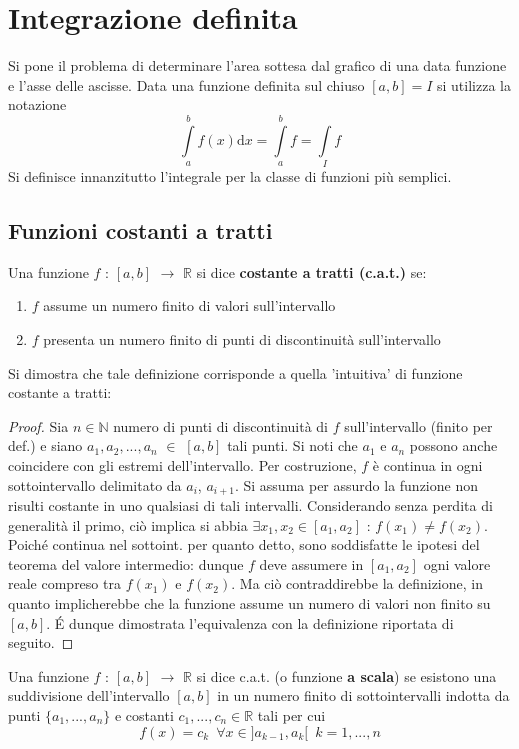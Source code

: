 \documentclass[10pt]{article}
\theoremstyle{plain}
\begin{document}
\section{Integrazione definita}
Si pone il problema di determinare l'area sottesa dal grafico di una data funzione e l'asse delle ascisse. Data una funzione definita sul chiuso $[a,b] = I$ si utilizza la notazione
\[\int \limits_a^b f(x) \textrm{d}x = \int \limits_a^b f = \int \limits_I f\]
Si definisce innanzitutto l'integrale per la classe di funzioni più semplici.

\subsection{Funzioni costanti a tratti}
\begin{defin}
    Una funzione $f$ : $[a,b]$ $\rightarrow$ $\mathbb{R}$ si dice \textbf{costante a tratti (c.a.t.)} se:
    \begin{enumerate}
        \item $f$ assume un numero finito di valori sull'intervallo
        \item $f$ presenta un numero finito di punti di discontinuità sull'intervallo
    \end{enumerate}
\end{defin}
Si dimostra che tale definizione corrisponde a quella 'intuitiva' di funzione costante a tratti:
\begin{proof}
    Sia $n \in \mathbb{N}$ numero di punti di discontinuità di $f$ sull'intervallo (finito per def.) e siano $a_1, a_2, ..., a_n$ $\in$ $[a,b]$ tali punti. Si noti che $a_1$ e $a_n$ possono anche coincidere con gli estremi dell'intervallo. Per costruzione, $f$ è continua in ogni sottointervallo delimitato da $a_i$, $a_{i+1}$. Si assuma per assurdo la funzione non risulti costante in uno qualsiasi di tali intervalli. Considerando senza perdita di generalità il primo, ciò implica si abbia $\exists x_1, x_2 \in [a_1, a_2]$ : $f(x_1) \neq f(x_2)$. Poiché continua nel sottoint. per quanto detto, sono soddisfatte le ipotesi del teorema del valore intermedio: dunque $f$ deve assumere in $[a_1, a_2]$ ogni valore reale compreso tra $f(x_1)$ e $f(x_2)$. Ma ciò contraddirebbe la definizione, in quanto implicherebbe che la funzione assume un numero di valori non finito su $[a,b]$. \'E dunque dimostrata l'equivalenza con la definizione riportata di seguito.
\end{proof}
\begin{defin}
    Una funzione $f$ : $[a,b]$ $\rightarrow$ $\mathbb{R}$ si dice c.a.t. (o funzione \textbf{a scala}) se esistono una suddivisione dell'intervallo $[a,b]$ in un numero finito di sottointervalli indotta da punti $\{a_1, ..., a_n\}$ e costanti $c_1, ..., c_n \in \mathbb{R}$ tali per cui
    \[f(x) = c_k \enspace \forall x \in ]a_{k-1}, a_k[ \enspace k=1, ..., n\]
\end{defin}
\end{document}
